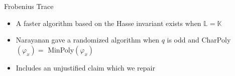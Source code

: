 \documentclass{beamer}
\begin{document}

\begin{frame}{Frobenius Trace}
\begin{itemize}

\item A faster algorithm based on the Hasse invariant exists when $\mathbb{L} = \mathbb{K}$
\item Narayanan gave a randomized algorithm when $q$ is odd and  CharPoly$(\varphi_x) = $ MinPoly$(\varphi_x)$
\item Includes an unjustified claim which we repair
\end{itemize}
\end{frame}




\end{document}
